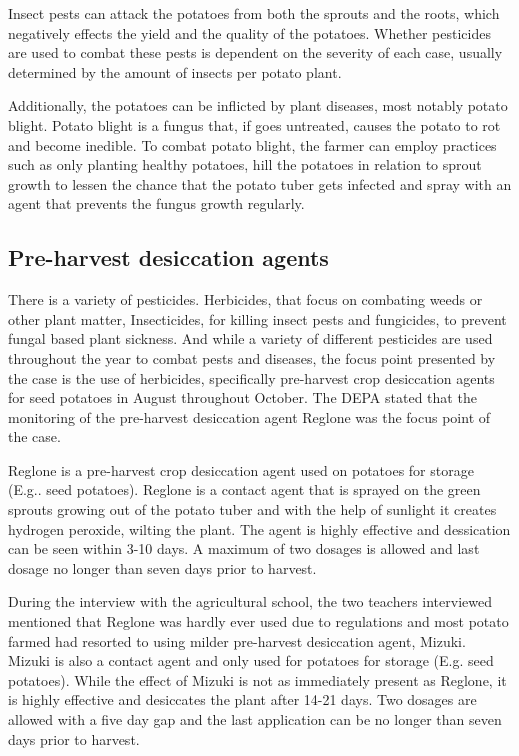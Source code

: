 Insect pests can attack the potatoes from both the sprouts and the roots, which negatively effects the yield and the quality of the potatoes. Whether pesticides are used to combat these pests is dependent on the severity of each case, usually determined by the amount of insects per potato plant\cite{InsectPests}.

Additionally, the potatoes can be inflicted by plant diseases, most notably potato blight. Potato blight is a fungus that, if goes untreated, causes the potato to rot and become inedible. To combat potato blight, the farmer can employ practices such as only planting healthy potatoes, hill the potatoes in relation to sprout growth to lessen the chance that the potato tuber gets infected and spray with an agent that prevents the fungus growth regularly\cite{PotatoBlight}. 

\subsection{Pre-harvest desiccation agents} \label{Pre-harvest desiccation agents}
There is a variety of pesticides. Herbicides, that focus on combating weeds or other plant matter, Insecticides, for killing insect pests and fungicides, to prevent fungal based plant sickness\cite{pesticiderUmbrellaterm}. And while a variety of different pesticides are used throughout the year to combat pests and diseases, the focus point presented by the case is the use of herbicides, specifically pre-harvest crop desiccation agents for seed potatoes in August throughout October.
The \acrshort{DEPA} stated that the monitoring of the pre-harvest desiccation agent Reglone was the focus point of the case\cite{oplægPP}. 

Reglone is a pre-harvest crop desiccation agent used on potatoes for storage (E.g.. seed potatoes). Reglone is a contact agent that is sprayed on the green sprouts growing out of the potato tuber and with the help of sunlight it creates hydrogen peroxide, wilting the plant. The agent is highly effective and dessication can be seen within 3-10 days. A maximum of two dosages is allowed and last dosage no longer than seven days prior to harvest\cite{Middeldatabasen}.

During the interview with the agricultural school, the two teachers interviewed mentioned that Reglone was hardly ever used due to regulations and most potato farmed had resorted to using milder pre-harvest desiccation agent, Mizuki\cite{interview}. Mizuki is also a contact agent and only used for potatoes for storage (E.g. seed potatoes). While the effect of Mizuki is not as immediately present as Reglone, it is highly effective and desiccates the plant after 14-21 days. Two dosages are allowed with a five day gap and the last application can be no longer than seven days prior to harvest\cite{Middeldatabasen}.

